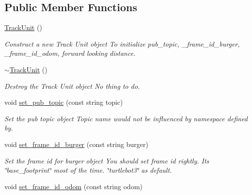 \subsection*{Public Member Functions}
\begin{DoxyCompactItemize}
\item 
\mbox{\label{class_global___planning_1_1_track_unit_af9ac69b18f983ad888a8594210ebf733}} 
\hyperlink{class_global___planning_1_1_track_unit_af9ac69b18f983ad888a8594210ebf733}{Track\+Unit} ()
\begin{DoxyCompactList}\small\item\em Construct a new Track Unit object To initialize pub\+\_\+topic, \+\_\+frame\+\_\+id\+\_\+burger, \+\_\+frame\+\_\+id\+\_\+odom, forward looking distance. \end{DoxyCompactList}\item 
\mbox{\label{class_global___planning_1_1_track_unit_a49ac9f7d9c6d7e505bcc398ac575fa22}} 
\hyperlink{class_global___planning_1_1_track_unit_a49ac9f7d9c6d7e505bcc398ac575fa22}{$\sim$\+Track\+Unit} ()
\begin{DoxyCompactList}\small\item\em Destroy the Track Unit object No thing to do. \end{DoxyCompactList}\item 
void \hyperlink{class_global___planning_1_1_track_unit_ae00c18addf83cc57a0ddfead96d53113}{set\+\_\+pub\+\_\+topic} (const string topic)
\begin{DoxyCompactList}\small\item\em Set the pub topic object Topic name would not be influenced by namespace defined by. \end{DoxyCompactList}\item 
void \hyperlink{class_global___planning_1_1_track_unit_a246c274d23f5e739f35720662b715feb}{set\+\_\+frame\+\_\+id\+\_\+burger} (const string burger)
\begin{DoxyCompactList}\small\item\em Set the frame id for burger object You should set frame id rightly. It\textquotesingle{}s \char`\"{}base\+\_\+footprint\char`\"{} most of the time. \char`\"{}turtlebot3\char`\"{} as default. \end{DoxyCompactList}\item 
void \hyperlink{class_global___planning_1_1_track_unit_a4a59723c0ffef932d43b837f19ac5f76}{set\+\_\+frame\+\_\+id\+\_\+odom} (const string odom)

\end{DoxyCompactItemize}
